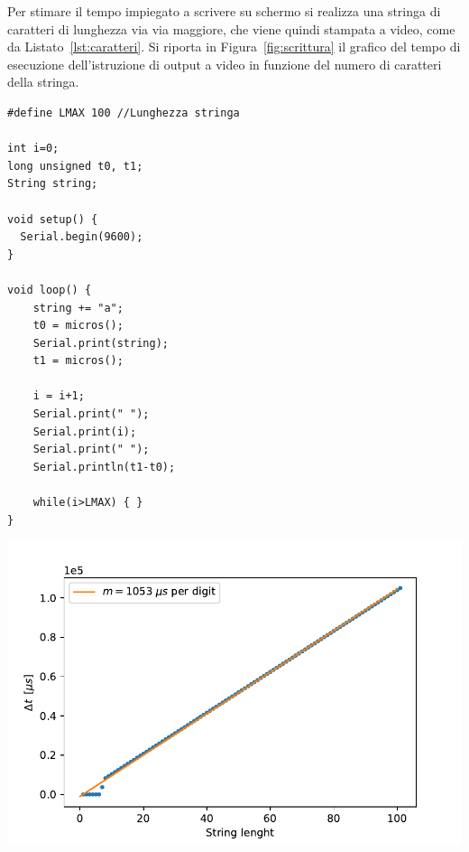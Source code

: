 \documentclass[10pt,oneside,a4paper]{article}
\newenvironment{Figure}
  {\par\medskip\noindent\minipage{\linewidth}}
  {\endminipage\par\medskip}
\begin{document}
\begin{multicols}{2}

Per stimare il tempo impiegato a scrivere su schermo si realizza una stringa di caratteri di lunghezza via via maggiore, che viene quindi stampata a video, come da Listato~\ref{lst:caratteri}. Si riporta in Figura~\ref{fig:scrittura} il grafico del tempo di esecuzione dell'istruzione di output a video in funzione del numero di caratteri della stringa.

\begin{lstlisting}[style=CStyle, caption={Codice per la misura dei tempi di scrittura a video}, label=lst:caratteri]
#define LMAX 100 //Lunghezza stringa

int i=0;
long unsigned t0, t1;
String string;

void setup() {
  Serial.begin(9600);
}

void loop() {
    string += "a";
    t0 = micros();
    Serial.print(string);
    t1 = micros();
    
    i = i+1;
    Serial.print(" ");
    Serial.print(i);
    Serial.print(" ");
    Serial.println(t1-t0);
    
    while(i>LMAX) { }
}
\end{lstlisting}

\begin{Figure}
	\begin{center}
	\includegraphics[width=\linewidth]{stringa.pdf}
	\label{fig:scrittura}
	\end{center}
\end{Figure}


\end{multicols}
\end{document}

